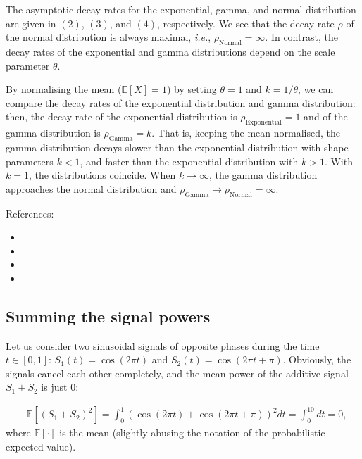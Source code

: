\documentclass{article}
\begin{document}
The asymptotic decay rates for the exponential, gamma, and normal distribution are given in $(2)$, $(3)$, and $(4)$, respectively. We see that the decay rate $\rho$ of the normal distribution is always maximal, \textit{i.e.}, $\rho_{\text{Normal}} = \infty$. In contrast, the decay rates of the exponential and gamma distributions depend on the scale parameter $\theta$.

By normalising the mean ($\mathbb{E}[X] = 1$) by setting $\theta = 1$ and $k=1/\theta$, we can compare the decay rates of the exponential distribution and gamma distribution: then, the decay rate of the exponential distribution is $\rho_{\text{Exponential}} = 1$ and of the gamma distribution is $\rho_{\text{Gamma}} = k$. That is, keeping the mean normalised, the gamma distribution decays slower than the exponential distribution with shape parameters $k<1$, and faster than the exponential distribution with $k>1$. With $k=1$, the distributions coincide. When $k \rightarrow \infty$, the gamma distribution approaches the normal distribution and $\rho_{\text{Gamma}} \rightarrow \rho_{\text{Normal}} = \infty$.


References:
\begin{itemize}
\item {}
\item {}
\item {}
\item {}

\end{itemize}
\subsection{Summing the signal powers}

Let us consider two sinusoidal signals of opposite phases during the time $t \in [0,1]$: $S_1(t) = \cos(2 \pi t)$ and $S_2(t) = \cos(2 \pi t + \pi)$. Obviously, the signals cancel each other completely, and the mean power of the additive signal $ S_1 + S_2$ is just $0$:

\begin{align}
  &\mathbb{E}[(S_1 + S_2)^2] = \int_0^1 (\cos(2 \pi t) + \cos(2 \pi t + \pi))^2dt = \int_0^10 dt = 0, \tag{1}
\end{align}
where $\mathbb{E}[\cdot]$ is the mean (slightly abusing the notation of the probabilistic expected value).
\end{document}
